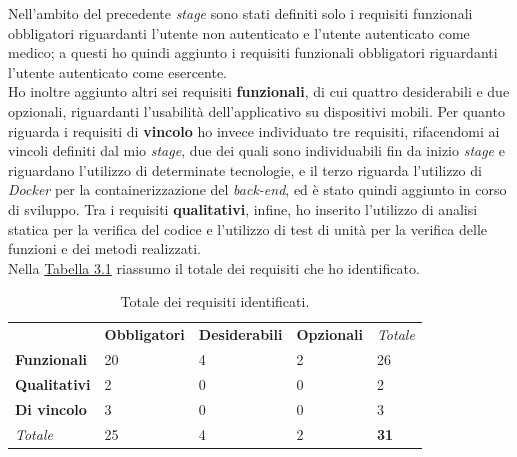 Nell'ambito del precedente \textit{stage} sono stati definiti solo i requisiti funzionali obbligatori riguardanti l'utente non autenticato e l'utente autenticato come medico; a questi ho quindi aggiunto i requisiti funzionali obbligatori riguardanti l'utente autenticato come esercente. \\
Ho inoltre aggiunto altri sei requisiti \textbf{funzionali}, di cui quattro desiderabili e due opzionali, riguardanti l'usabilità dell'applicativo su dispositivi mobili. Per quanto riguarda i requisiti di \textbf{vincolo} ho invece individuato tre requisiti, rifacendomi ai vincoli definiti dal mio \textit{stage}, due dei quali sono individuabili fin da inizio \textit{stage} e riguardano l'utilizzo di determinate tecnologie, e il terzo riguarda l'utilizzo di \textit{Docker} per la containerizzazione del \textit{back-end}, ed è stato quindi aggiunto in corso di sviluppo. Tra i requisiti \textbf{qualitativi}, infine, ho inserito l'utilizzo di analisi statica per la verifica del codice e l'utilizzo di test di unità per la verifica delle funzioni e dei metodi realizzati. \\
Nella \hyperref[tab:totale-requisiti]{Tabella 3.1} riassumo il totale dei requisiti che ho identificato.

\begin{table}[h]
  \label{tab:totale-requisiti}
  \begin{center}
  \begin{tabularx}{\textwidth}{lllll}

                                              & \textbf{Obbligatori}    & \textbf{Desiderabili}  & \textbf{Opzionali}     & \textit{Totale}                  \\ \cline{2-5}
    \multicolumn{1}{l|}{\textbf{Funzionali}}  & \multicolumn{1}{l|}{20} & \multicolumn{1}{l|}{4} & \multicolumn{1}{l|}{2} & \multicolumn{1}{l|}{26}          \\ \cline{2-5}
    \multicolumn{1}{l|}{\textbf{Qualitativi}} & \multicolumn{1}{l|}{2}  & \multicolumn{1}{l|}{0} & \multicolumn{1}{l|}{0} & \multicolumn{1}{l|}{2}           \\ \cline{2-5}
    \multicolumn{1}{l|}{\textbf{Di vincolo}}  & \multicolumn{1}{l|}{3}  & \multicolumn{1}{l|}{0} & \multicolumn{1}{l|}{0} & \multicolumn{1}{l|}{3}           \\ \cline{2-5}
    \multicolumn{1}{l|}{\textit{Totale}}      & \multicolumn{1}{l|}{25} & \multicolumn{1}{l|}{4} & \multicolumn{1}{l|}{2} & \multicolumn{1}{l|}{\textbf{31}} \\ \cline{2-5}
\end{tabularx}
\end{center}
\caption{Totale dei requisiti identificati.}
\end{table}

